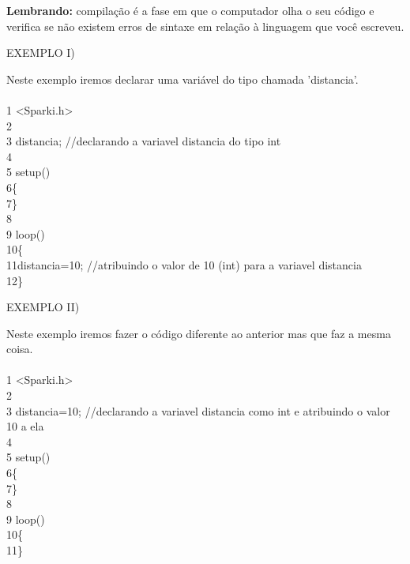 \documentclass[conference]{IEEEtran}
\begin{document}
    \par
    \textbf{Lembrando: }compilação é a fase em que o computador olha o seu código e verifica se não existem erros de sintaxe em relação à linguagem que você escreveu. \\
    \begin{center}
    EXEMPLO I)        
    \end{center}
    \par
    Neste exemplo iremos declarar uma variável do tipo {} chamada 'distancia'.
    \\
    \\
    {\selectfont 
    {\color{cinza}1} <Sparki.h>\\
    {\color{cinza}2}\\
    {\color{cinza}3} distancia; {\color{cinza}//declarando a variavel distancia do tipo int}\\
    {\color{cinza}4}\\
    {\color{cinza}5} setup()\\
    {\color{cinza}6}\quad\{\\
    {\color{cinza}7}\quad\}\\
    {\color{cinza}8}\\
    {\color{cinza}9} loop()\\
    {\color{cinza}10}\quad\{\\
    {\color{cinza}11}\quad\quad distancia=10; {\color{cinza}//atribuindo o valor de 10 (int) para a variavel distancia}\\
    {\color{cinza}12}\quad\}
    }
    \begin{center}
        EXEMPLO II)\\
    \end{center}
    \par
    Neste exemplo iremos fazer o código diferente ao anterior mas que faz a mesma coisa. \\
    \\
    {\selectfont 
    {\color{cinza}1} <Sparki.h>\\
    {\color{cinza}2}\\
    {\color{cinza}3} distancia=10; {\color{cinza}//declarando a variavel distancia como int e atribuindo o valor 10 a ela}\\
    {\color{cinza}4}\\
    {\color{cinza}5} setup()\\
    {\color{cinza}6}\quad\{\\
    {\color{cinza}7}\quad\}\\
    {\color{cinza}8}\\
    {\color{cinza}9} loop()\\
    {\color{cinza}10}\quad\{ \\
    {\color{cinza}11}\quad\} \\
    }
\end{document}
